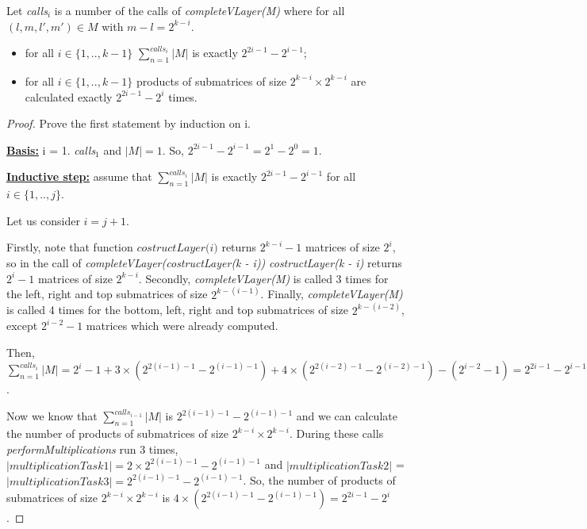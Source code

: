 \begin{lemma}
Let \textit{calls$_{i}$} is a number of the calls of \textit{completeVLayer(M)} where for all $(l, m, l', m') \in M$ with $m - l = 2^{k - i}$.
\begin{itemize}
 \item for all $i \in \{ 1, .., k - 1\}$  $\sum_{n=1}^{calls_i}{|M|}$ is exactly $2^{2i - 1} - 2^{i - 1}$;
 \item for all $ i \in \{ 1, .., k - 1\}$ products of submatrices of size $2^{k - i} \times 2^{k - i}$ are calculated exactly $2^{2i - 1} - 2^{i}$ times.
\end{itemize}
\end{lemma}

\begin{proof}

Prove the first statement by induction on i.

\underline{\textbf{Basis:}} i = 1. \textit{calls$_{1}$} and $|M| = 1$. So, $2^{2i - 1} - 2^{i - 1} = 2^1 - 2^0 = 1$.

\underline{\textbf{Inductive step:}} assume that $\sum_{n=1}^{calls_i}{|M|}$ is exactly $2^{2i - 1} - 2^{i - 1}$ for all $i \in \{ 1, .., j\}$.

Let us consider $i = j + 1$.

Firstly, note that function $\textit{costructLayer(i)}$ returns $2^{k - i} - 1$ matrices of size $2^i$, so in the call of \textit{completeVLayer(costructLayer(k - i))}  \textit{costructLayer(k - i)} returns $2^i - 1$ matrices of size $2^{k - i}$. 
Secondly, \textit{completeVLayer(M)} is called 3 times for the left, right and top submatrices of size $2^{k - (i - 1)}$. Finally, \textit{completeVLayer(M)} is called 4 times for the bottom, left, right and top submatrices of size $2^{k - (i - 2)}$, except $2^{i - 2} - 1$ matrices which were already computed.

Then, $\sum_{n=1}^{calls_i}{|M|} = 2^{i} - 1 + 3 \times (2^{2(i - 1) - 1} - 2^{(i - 1) - 1}) + 4 \times (2^{2(i - 2) - 1} - 2^{(i - 2) - 1}) - (2^{i - 2} - 1) = 2^{2i - 1} - 2^{i - 1}$.

Now we know that $\sum_{n=1}^{calls_{i-1}}{|M|}$  is $2^{2(i - 1) - 1} - 2^{(i - 1) - 1}$ and we can calculate the number of products of submatrices of size $2^{k - i} \times 2^{k - i}$. 
During these calls \textit{performMultiplications} run 3 times, $|multiplicationTask1| = 2 \times 2^{2(i - 1) - 1} - 2^{(i - 1) - 1}$ and $|multiplicationTask2|$ = $|multiplicationTask3| = 2^{2(i - 1) - 1} - 2^{(i - 1) - 1}$. So, the number of products of submatrices of size $2^{k - i} \times 2^{k - i}$ is $ 4 \times (2^{2(i - 1) - 1} - 2^{(i - 1) - 1}) = 2^{2i - 1} - 2^{i}$.
\end{proof}


